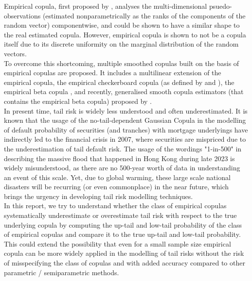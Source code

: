 \documentclass[12pt]{report}
\newcommand{\1}{\mathbf{1}}
\begin{document}
\begin{flushleft}
\vspace{0.5cm}
Empirical copula, first proposed by \cite{DeheuvelsEC}, analyses the multi-dimensional psuedo-observations (estimated nonparametrically as the ranks of the components of the random vector) componentwise, and could be shown to have a similar shape to the real estimated copula. However, empirical copula is shown to not be a copula itself due to its discrete uniformity on the marginal distribution of the random vectors. \\
\vspace{0.5cm}
To overcome this shortcoming, multiple smoothed copulas built on the basis of empirical copulas are proposed. It includes a multilinear extension of the empirical copula, the empirical checkerboard copula (as defined by \cite{CarleyTaylorECC} and \cite{HofertBook}), the empirical beta copula \parencite{SegersEBC}, and recently, generalised smooth copula estimators (that contains the empirical beta copula) proposed by \cite{KojadinovicYi2024Smooth}. \\
\vspace{0.5cm}
In present time, tail risk is widely less understood and often underestimated. It is known that the usage of the no-tail-dependent Gaussian Copula in the modelling of default probability of securities (and tranches) with mortgage underlyings have indirectly led to the financial crisis in 2007, where securities are mispriced due to the underestimation of tail default risk. The usage of the wordings "1-in-500" in describing the massive flood that happened in Hong Kong during late 2023 is widely misunderstood, as there are no 500-year worth of data in understanding an event of this scale. Yet, due to global warming, these large scale national disasters will be recurring (or even commonplace) in the near future, which brings the urgency in developing tail risk modelling techniques. \\
\vspace{0.5cm}
In this report, we try to understand whether the class of empirical copulas systematically underestimate or overestimate tail risk with respect to the true underlying copula by computing the up-tail and low-tail probability of the class of empirical copulas and compare it to the true up-tail and low-tail probability. This could extend the possibility that even for a small sample size empirical copula can be more widely applied in the modelling of tail risks without the risk of misspecifying the class of copulas and with added accuracy compared to other parametric / semiparametric methods. \\
\vspace{0.5cm}


\end{flushleft}
\end{document}
